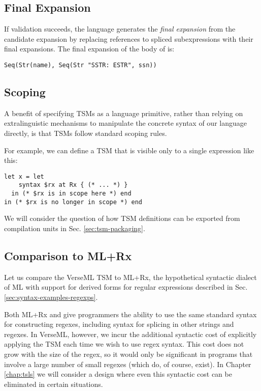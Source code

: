 \subsection{Final Expansion}
If validation succeeds, the language generates the \emph{final expansion} from the candidate expansion by replacing references to spliced subexpressions with their final expansions. The final expansion of the body of  is:
\begin{lstlisting}[numbers=none]
Seq(Str(name), Seq(Str "SSTR: ESTR", ssn))
\end{lstlisting}

\subsection{Scoping}
A benefit of specifying TSMs as a language primitive, rather than relying on extralinguistic mechanisms to manipulate the concrete syntax of our language directly, is that TSMs follow standard scoping rules. 

For example, we can define a TSM that is visible only to a single expression like this:
\begin{lstlisting}[numbers=none]
let x = let 
    syntax $rx at Rx { (* ... *) }
  in (* $rx is in scope here *) end 
in (* $rx is no longer in scope *) end
\end{lstlisting}

We will consider the question of how TSM definitions can be exported from compilation units in Sec. \ref{sec:tsm-packaging}.

\subsection{Comparison to ML+Rx}
Let us compare the VerseML TSM  to ML+Rx, the hypothetical syntactic dialect of ML with support for derived forms for regular expressions described in Sec. \ref{sec:syntax-examples-regexps}.

Both ML+Rx and  give programmers the ability to use the same standard syntax for constructing regexes, including syntax for splicing in other strings and regexes. In VerseML, however, we incur the additional syntactic cost of explicitly applying the  TSM each time we wish to use regex syntax. This cost does not grow with the size of the regex, so it would only be significant in programs that involve a large number of small regexes (which do, of course, exist). In Chapter \ref{chap:tsls} we will consider a design where even this syntactic cost can be eliminated in certain situations.

